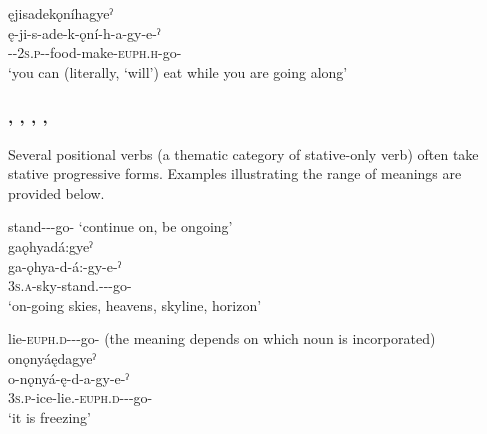 
\ex ęjisadekǫníhagyeˀ\\
\gll ę-ji-s-ade-k-ǫní-h-a-gy-e-ˀ\\
\fut-{\repetitive}-\textsc{2s.p}-{\semireflexive}-food-make-\textsc{euph.h}\exsc{-\joiner-\progressive}-go-{\stative}\\
\glt ‘you can (literally, ‘will’) eat while you are going along’

\z
\z


\subsubsection*{, , , , } \label{ch:[-dagyeˀ], [-ędagyeˀ], [-odagyeˀ], [-ǫdagyeˀ], [-oˀkd-agyeˀ]}
Several positional verbs (a thematic category of stative-only verb) often take stative progressive forms. Examples illustrating the range of meanings are provided below.
 
\newpage
\ea\label{ex:purpprogsufex2}
 stand-{\joinerA}-{\progressive}-go-{\stative} ‘continue on, be ongoing’\\
gaǫhyadá:gyeˀ\\
\gll ga-ǫhya-d-á:-gy-e-ˀ\\
 \textsc{3s.a}-sky-stand.{\stative}-{\joinerA-\progressive}-go-{\stative}\\
\glt `on-going skies, heavens, skyline, horizon'
\z


\ea\label{ex:purpprogsufex3}  lie-\textsc{euph.d-\joinerA}-\exsc{\progressive}-go-{\stative} (the meaning depends on which noun is incorporated)
\ea onǫnyáędagyeˀ\\
\gll o-nǫnyá-ę-d-a-gy-e-ˀ\\
 \textsc{3s.p}-ice-lie.{\stative}-\textsc{euph.d-\joinerA}-{\progressive}-go-{\stative}\\
\glt `it is freezing'


